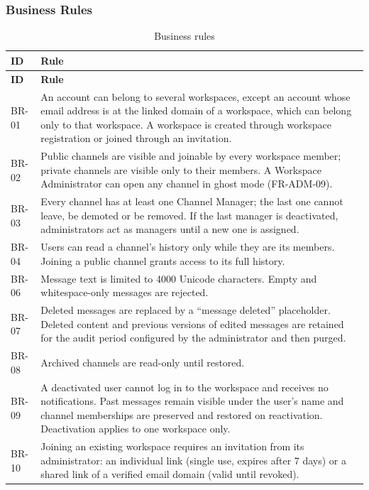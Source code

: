 \documentclass[
    english, %
]{VUMIFPSkursinis}
\begin{document}
\subsubsection{Business Rules}
\begin{longtable}{|p{}|p{}|}
\caption{Business rules}\\ \hline
\textbf{ID} & \textbf{Rule} \\ \hline
\endfirsthead
\hline \textbf{ID} & \textbf{Rule} \\ \hline
\endhead
BR-01 & An account can belong to several workspaces, except an account whose email address is at the linked domain of a workspace, which can belong only to that workspace. A workspace is created through workspace registration or joined through an invitation. \\ \hline
BR-02 & Public channels are visible and joinable by every workspace member; private channels are visible only to their members. A Workspace Administrator can open any channel in ghost mode (FR-ADM-09). \\ \hline
BR-03 & Every channel has at least one Channel Manager; the last one cannot leave, be demoted or be removed. If the last manager is deactivated, administrators act as managers until a new one is assigned. \\ \hline
BR-04 & Users can read a channel's history only while they are its members. Joining a public channel grants access to its full history. \\ \hline
BR-06 & Message text is limited to 4000 Unicode characters. Empty and whitespace-only messages are rejected. \\ \hline
BR-07 & Deleted messages are replaced by a ``message deleted'' placeholder. Deleted content and previous versions of edited messages are retained for the audit period configured by the administrator and then purged. \\ \hline
BR-08 & Archived channels are read-only until restored. \\ \hline
BR-09 & A deactivated user cannot log in to the workspace and receives no notifications. Past messages remain visible under the user's name and channel memberships are preserved and restored on reactivation. Deactivation applies to one workspace only. \\ \hline
BR-10 & Joining an existing workspace requires an invitation from its administrator: an individual link (single use, expires after 7 days) or a shared link of a verified email domain (valid until revoked). \\ \hline

\end{longtable}
\end{document}
